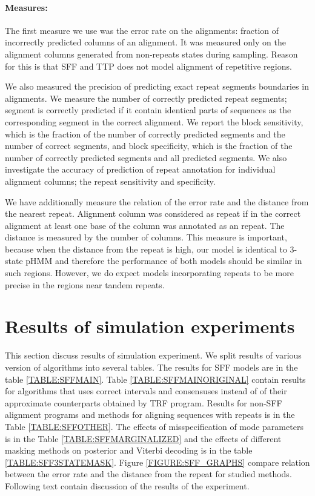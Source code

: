 \paragraph{Measures:} The first measure we use was the error rate on the
alignments: fraction of incorrectly predicted columns of an alignment. It was
measured only on the alignment columns generated from non-repeats states during
sampling. Reason for this is that SFF and TTP does not model alignment of
repetitive regions.

We also measured the precision of predicting exact repeat segments boundaries
in alignments. We measure the number of correctly predicted repeat segments;
segment is correctly predicted if it contain identical parts of sequences as
the corresponding segment in the correct alignment. We report the block
sensitivity, which is the fraction of the number of correctly predicted
segments and the number of correct segments, and block specificity, which is
the fraction of the number of correctly predicted segments and all predicted
segments. We also investigate the accuracy of prediction of repeat annotation
for individual alignment columns; the repeat sensitivity and specificity.

We have additionally measure the relation of the error rate and the distance
from the nearest repeat. Alignment column was considered as repeat if in the
correct alignment at least one base of the column was annotated as an repeat.
The distance is measured by the number of columns. This measure is important,
because when the distance from the repeat is high, our model is identical to
3-state pHMM and therefore the performance of both models should be similar in
such regions.  However, we do expect models incorporating repeats to be more
precise in the regions near tandem repeats.

\section{Results of simulation experiments}\label{SECTION:REPSIMRESULTS}

This section discuss results of simulation experiment. We split results of
various version of algorithms into several tables. The results for SFF models
are in the table \ref{TABLE:SFFMAIN}. Table \ref{TABLE:SFFMAINORIGINAL} contain
results for algorithms that uses correct intervals and consensuses instead of
of their approximate counterparts obtained by TRF program. Results for non-SFF
alignment programs and methods for aligning sequences with repeats is in the
Table \ref{TABLE:SFFOTHER}. The effects of misspecification of mode parameters
is in the Table \ref{TABLE:SFFMARGINALIZED} and the effects of different
masking methods on posterior and Viterbi decoding is in the table
\ref{TABLE:SFF3STATEMASK}. Figure \ref{FIGURE:SFF_GRAPHS} compare relation
between the error rate and the distance from the repeat for studied methods.
Following text contain discussion of the results of the experiment.

